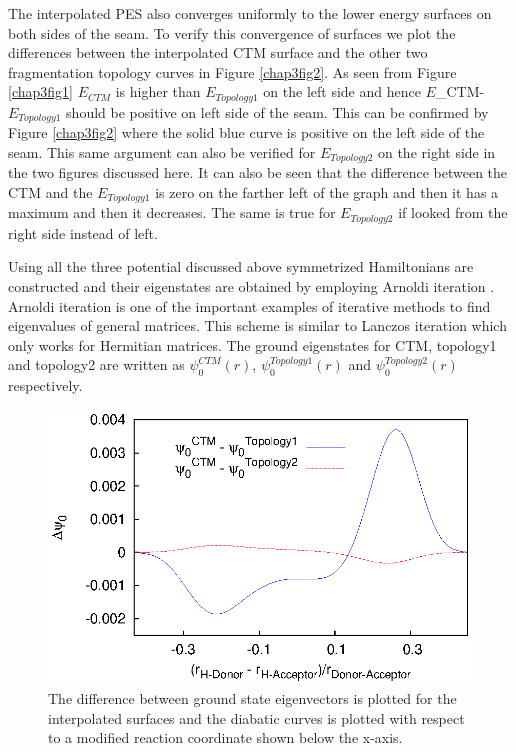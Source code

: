 The interpolated PES also converges uniformly to the lower energy surfaces on both sides of the
seam. To verify this convergence of surfaces we plot the differences between the interpolated
CTM surface and the other two fragmentation topology curves in Figure \ref{chap3fig2}. As seen from Figure
\ref{chap3fig1} $E_{CTM}$ is higher than $E_{Topology1}$ on the left side and hence $E$_{CTM}-$E_{Topology1}$
should be positive on left side of the seam. This can be confirmed by Figure \ref{chap3fig2} where
the solid blue curve is positive on the left side of the seam. This same argument can also be
verified for $E_{Topology2}$ on the right side in the two figures discussed here. It can also be seen that
the difference between the CTM and the $E_{Topology1}$ is zero on the farther left of the graph and
then it has a maximum and then it decreases. The same is true for $E_{Topology2}$ if looked from the right
side instead of left.

Using all the three potential discussed above symmetrized Hamiltonians are constructed and their eigenstates are
obtained by employing Arnoldi iteration \cite{sorensen1992implicit, parlett1987complex, van1996matrix}.
Arnoldi iteration is one of the important examples of iterative methods to find eigenvalues of
general matrices. This scheme is similar to Lanczos iteration which only works for Hermitian
matrices. The ground eigenstates for CTM, topology1 and topology2 are written as $\psi_{0}^{CTM}(r)$,
$\psi_{0}^{Topology1}(r)$ and $\psi_{0}^{Topology2}(r)$ respectively.

\begin{figure}[!hbt]
  \begin{center}
    \includegraphics[width=1\textwidth]{figures/DiffEVRepeated.eps}
    \caption{\label{chap3fig3} The difference between ground state eigenvectors is plotted for the interpolated surfaces
     and the diabatic curves is plotted with respect to a modified reaction coordinate shown below the x-axis.}
  \end{center}
\end{figure}


